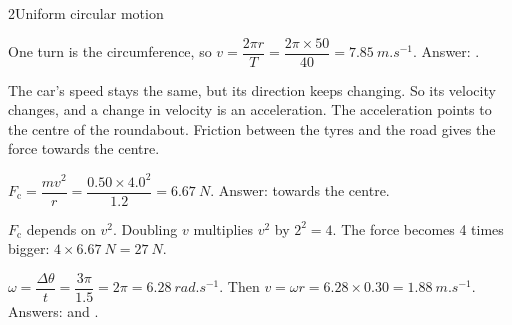 \begin{chapteranswers}{2}{Uniform circular motion}
  \item One turn is the circumference, so
        $v = \dfrac{2\pi r}{T} = \dfrac{2\pi \times 50}{40} = \qty{7.85}{m.s^{-1}}$.
        Answer: .
  \item The car's speed stays the same, but its direction keeps changing. So its
        velocity changes, and a change in velocity is an acceleration. The
        acceleration points to the centre of the roundabout. Friction between
        the tyres and the road gives the force towards the centre.
  \item $F_\mathrm{c} = \dfrac{mv^2}{r} = \dfrac{0.50 \times 4.0^2}{1.2}
        = \qty{6.67}{N}$. Answer:  towards
        the centre.
  \item $F_\mathrm{c}$ depends on $v^2$. Doubling $v$ multiplies $v^2$ by
        $2^2 = 4$. The force becomes 4 times bigger:
        $4 \times \qty{6.67}{N} = \qty{27}{N}$.
  \item $\omega = \dfrac{\Delta\theta}{t} = \dfrac{3\pi}{1.5} = 2\pi
        = \qty{6.28}{rad.s^{-1}}$. Then
        $v = \omega r = 6.28 \times 0.30 = \qty{1.88}{m.s^{-1}}$.
        Answers:  and
        .
\end{chapteranswers}

